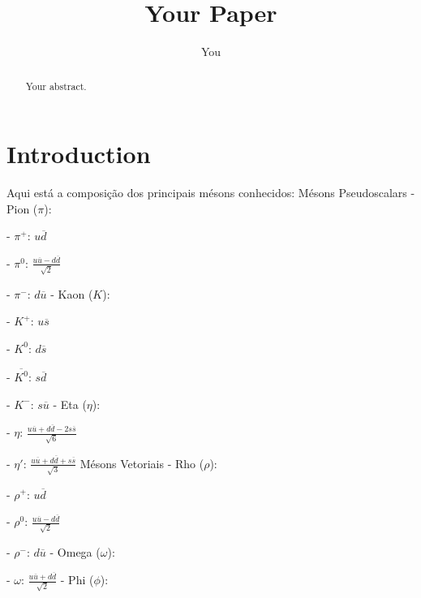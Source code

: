 \documentclass{article}
\title{Your Paper}
\author{You}
\begin{document}
\maketitle

\begin{abstract}
Your abstract.
\end{abstract}

\section{Introduction}
Aqui está a composição dos principais mésons conhecidos:
\newline
\newline
Mésons Pseudoscalars
\newline
\newline
- Pion ($\pi$):

    - $\pi^+$: $u\overline{d}$
    
    - $\pi^0$: $\frac{u\overline{u} - d\overline{d}}{\sqrt{2}}$
    
    - $\pi^-$: $d\overline{u}$
\newline
\newline
- Kaon ($K$):

    - $K^+$: $u\overline{s}$
    
    - $K^0$: $d\overline{s}$
    
    - $\overline{K^0}$: $s\overline{d}$
    
    - $K^-$: $s\overline{u}$
\newline
\newline
- Eta ($\eta$):

    - $\eta$: $\frac{u\overline{u} + d\overline{d} - 2s\overline{s}}{\sqrt{6}}$
    
    - $\eta'$: $\frac{u\overline{u} + d\overline{d} + s\overline{s}}{\sqrt{3}}$
\newline
\newline
Mésons Vetoriais
\newline
\newline
- Rho ($\rho$):

    - $\rho^+$: $u\overline{d}$
    
    - $\rho^0$: $\frac{u\overline{u} - d\overline{d}}{\sqrt{2}}$
    
    - $\rho^-$: $d\overline{u}$
\newline
\newline
- Omega ($\omega$):

    - $\omega$: $\frac{u\overline{u} + d\overline{d}}{\sqrt{2}}$
\newline
\newline
- Phi ($\phi$):
\end{document}

